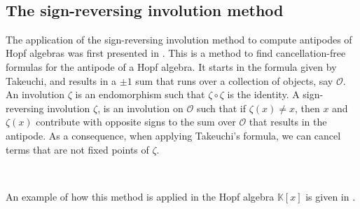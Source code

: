 \documentclass[12pt, reqno]{amsart}
\theoremstyle{definition}
\begin{document}
\

\subsection{The sign-reversing involution method}

The application of the sign-reversing involution method to compute antipodes of Hopf algebras was first presented in \cite{BS2017}.
This is a method to find cancellation-free formulas for the antipode of a Hopf algebra.
It starts in the formula given by Takeuchi, and results in a $\pm1$ sum that runs over a collection of objects, say $\mathcal O$.
An involution $\zeta $ is an endomorphism such that $\zeta \circ \zeta$ is the identity.
A sign-reversing involution $\zeta $, is an involution on $\mathcal O$ such that if $\zeta(x) \neq x$, then $x$ and $\zeta(x)$ contribute with opposite signs to the sum over $\mathcal O$ that results in the antipode.
As a consequence, when applying Takeuchi's formula, we can cancel terms that are not fixed points of $\zeta$.


%

\


An example of how this method is applied in the Hopf algebra $\mathbb{K}[x]$ is given in \cite{BS2017}.
\end{document}
